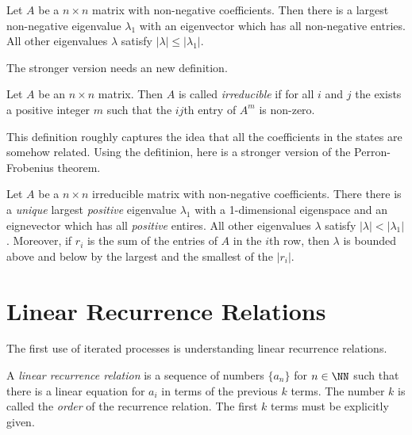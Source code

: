 \documentclass[fleqn]{report}
\begin{document}
\begin{thm}
Let $A$ be a $n\times n$ matrix with non-negative
coefficients. Then there is a largest non-negative eigenvalue
$\lambda_1$ with an eigenvector which has all non-negative
entries. All other eigenvalues $\lambda$ satisfy
$|\lambda| \leq |\lambda_1|$.
\end{thm}

The stronger version needs an new definition.

\begin{defn}
Let $A$ be an $n \times n$ matrix. Then $A$ is called
\emph{irreducible} if for all $i$ and $j$ the exists a
positive integer $m$ such that the $ij$th entry of $A^m$ is
non-zero.
\end{defn}

This definition roughly captures the idea that all the
coefficients in the states are somehow related. Using the
defitinion, here is a stronger version of the Perron-Frobenius
theorem.

\begin{thm}
Let $A$ be a $n \times n$ irreducible matrix with non-negative
coefficients. There there is a \emph{unique} largest
\emph{positive} eigenvalue $\lambda_1$ with a 1-dimensional
eigenspace and an eignevector which has all \emph{positive}
entires. All other eigenvalues $\lambda$ satisfy $|\lambda| <
|\lambda_1|$. Moreover, if $r_i$ is the sum of the entries of
$A$ in the $i$th row, then $\lambda$ is bounded above and
below by the largest and the smallest of the $|r_i|$. 
\end{thm} 

\section{Linear Recurrence Relations}
\label{recurrence}

The first use of iterated processes is understanding linear
recurrence relations.

\begin{defn}
A \emph{linear recurrence relation} is a sequence of numbers
$\{a_n\}$ for $n \in \NN$ such that there is a linear equation
for $a_i$ in terms of the previous $k$ terms. The
number $k$ is called the \emph{order} of the
recurrence relation. The first $k$ terms must be explicitly
given.
\end{defn}
\end{document}
